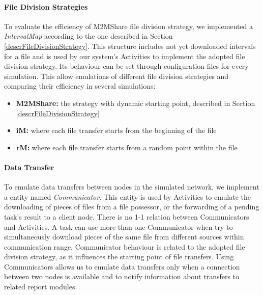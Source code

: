 \paragraph{File Division Strategies}
To evaluate the efficiency of M2MShare file division strategy, we implemented a \textit{IntervalMap} according to the one described in Section \ref{descrFileDivisionStrategy}. This structure includes not yet downloaded intervals for a file and is used by our system's Activities to implement the adopted file division strategy. Its behaviour can be set through configuration files for every simulation. This allow emulations of different file division strategies and comparing their efficiency in several simulations:
\begin{itemize}
\item \textbf{M2MShare:} the strategy with dynamic starting point, described in Section \ref{descrFileDivisionStrategy}
\item \textbf{iM:} where each file transfer starts from the beginning of the file
\item \textbf{rM:} where each file transfer starts from a random point within the file
\end{itemize}


\paragraph{Data Transfer}
To emulate data transfers between nodes in the simulated network, we implement a entity named \textit{Communicator}. This entity is used by Activities to emulate the downloading of pieces of files from a file possessor, or the forwarding of a pending task's result to a client node. There is no 1-1 relation between Communicators and Activities. A task can use more than one Communicator when try to simultaneously download pieces of the same file from different sources within communication range. Communicator behaviour is related to the adopted file division strategy, as it influences the starting point of file transfers. Using Communicators allows us to emulate data transfers only when a connection between two nodes is available and to notify information about transfers to related report modules.

%
 
